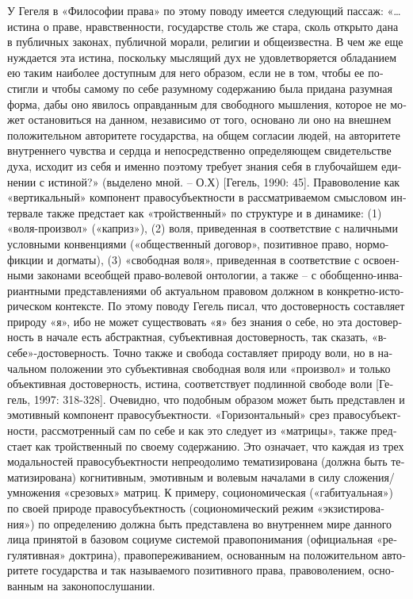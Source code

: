 \begin{russian}
    У Гегеля в «Философии права» по этому поводу имеется следующий пассаж: «… истина о праве, нравственности, государстве столь же стара, сколь открыто дана в публичных законах, публичной морали, религии и общеизвестна. В чем же еще нуждается эта истина, поскольку мыслящий дух не удовлетворяется обладанием ею таким наиболее доступным для него образом, если не в том, чтобы ее постигли и чтобы самому по себе разумному содержанию была придана разумная форма, дабы оно явилось оправданным для свободного мышления, которое не может остановиться на данном, независимо от того, основано ли оно на внешнем положительном авторитете государства, на общем согласии людей, на авторитете внутреннего чувства и сердца и непосредственно определяющем свидетельстве духа, исходит из себя и именно поэтому требует знания себя в глубочайшем единении с истиной?» (выделено мной. – О.Х) [Гегель, 1990: 45]. 
           Правоволение как «вертикальный» компонент правосубъектности в рассматриваемом смысловом интервале  также предстает как «тройственный» по структуре и в динамике: (1) «воля-произвол» («каприз»),  (2) воля, приведенная в соответствие с наличными условными конвенциями  («общественный договор», позитивное право, нормо-фикции и догматы),  (3) «свободная воля», приведенная в соответствие с освоенными законами всеобщей право-волевой онтологии, а также – с обобщенно-инвариантными представлениями об актуальном правовом должном в конкретно-историческом контексте.  По этому поводу Гегель писал, что достоверность составляет природу «я», ибо не может существовать «я» без знания о себе, но эта достоверность в начале есть абстрактная, субъективная достоверность, так сказать, «в-себе»-достоверность. Точно также и свобода составляет природу воли, но в начальном положении это субъективная свободная воля или «произвол» и только объективная достоверность, истина, соответствует подлинной свободе воли [Гегель, 1997: 318-328]. 
    Очевидно, что подобным образом может быть представлен и эмотивный компонент правосубъектности. 
     «Горизонтальный» срез правосубъектности, рассмотренный сам по себе и как это следует из «матрицы», также предстает как тройственный по своему содержанию. Это означает, что каждая из трех модальностей правосубъектности непреодолимо тематизирована (должна быть тематизирована) когнитивным, эмотивным и волевым началами в силу сложения/умножения «срезовых» матриц. К примеру, социономическая («габитуальная») по своей природе правосубъектность (социономический режим «экзистирования») по определению должна быть представлена во внутреннем мире данного лица принятой в базовом социуме системой правопонимания (официальная «регулятивная» доктрина), правопереживанием, основанным на положительном авторитете государства и так называемого позитивного права, правоволением, основанным на законопослушании.

\end{russian}
